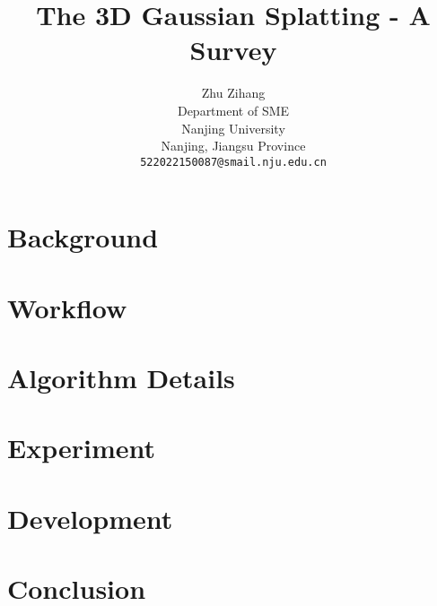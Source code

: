 \documentclass{arxiv_art/arxiv_art}
\title{The 3D Gaussian Splatting - A Survey}
\author{
    \hspace{1mm}Zhu Zihang \\
    Department of SME \\
    Nanjing University\\
    Nanjing, Jiangsu Province \\
    \texttt{522022150087@smail.nju.edu.cn}
}
\begin{document}
\maketitle 

\begin{abstract}
    
\end{abstract}

\section{Background}\label{sec:background}


\section{Workflow}\label{sec:workflow}


\section{Algorithm Details}\label{sec:details}


\section{Experiment}\label{sec:experiment}


\section{Development}\label{sec:development}


\section{Conclusion}\label{sec:conclusion}




\end{document}
